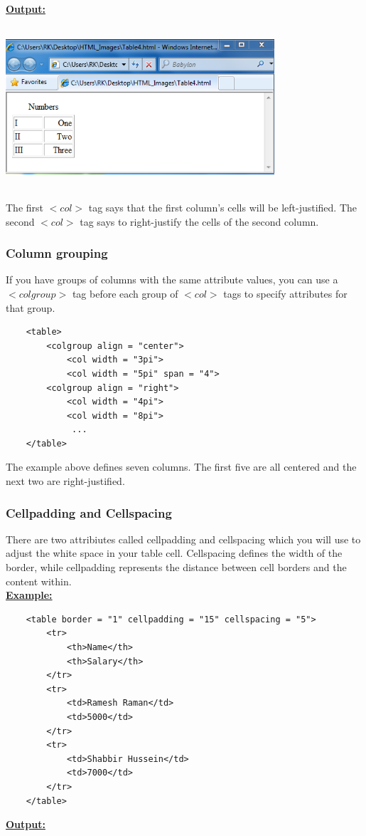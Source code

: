 \documentclass[11pt,a4paper]{article}
\begin{document}
\underline{\textbf{Output:}}

\includegraphics[height = 60mm, width = 100mm]{Table4.png}

The first $<col>$ tag says that the first column's cells will be left-justified. The second $<col>$ tag says to right-justify the cells of the second column.

\subsubsection*{Column grouping}
If you have groups of columns with the same attribute values, you can use a $<colgroup>$ tag before each group of $<col>$ tags to specify attributes for that group.
\begin{verbatim}
    <table>
        <colgroup align = "center">
            <col width = "3pi">
            <col width = "5pi" span = "4">
        <colgroup align = "right">
            <col width = "4pi">
            <col width = "8pi">
             ...
    </table>
\end{verbatim}
The example above defines seven columns. The first five are all centered and the next two are right-justified.

\subsubsection*{Cellpadding and Cellspacing}
There are two attribiutes called cellpadding and cellspacing which you will use to adjust the white space in your table cell. Cellspacing defines the width of the border, while cellpadding represents the distance between cell borders and the content within.\\

\underline{\textbf{Example:}}\\

\begin{verbatim}
    <table border = "1" cellpadding = "15" cellspacing = "5">
        <tr>
            <th>Name</th>
            <th>Salary</th>
        </tr>
        <tr>
            <td>Ramesh Raman</td>
            <td>5000</td>
        </tr>
        <tr>
            <td>Shabbir Hussein</td>
            <td>7000</td>
        </tr>
    </table>
\end{verbatim}
\underline{\textbf{Output:}}
\end{document}
